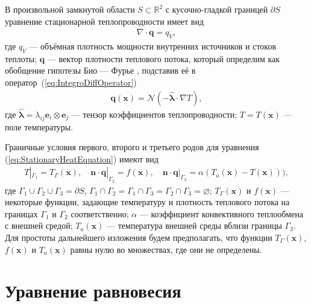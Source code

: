 В произвольной замкнутой области $S \subset \mathbb{R}^2$ с кусочно-гладкой границей $\partial S$ уравнение стационарной теплопроводности имеет вид \cite{MSS}
\begin{gather}
	\label{eq:StationaryHeatEquation}
	\nabla \cdot \boldsymbol{q} = q_V,
\end{gather}
где $q_V$ --- объёмная плотность мощности внутренних источников и стоков теплоты;
$\boldsymbol{q}$ --- вектор плотности теплового потока, который определим как обобщение гипотезы Био --- Фурье \cite{ThermoViscoElasticity1, ThermoViscoElasticity2, ThermoViscoElasticity3}, подставив её в \mbox{оператор~(\ref{eq:IntegroDiffOperator})}
\begin{gather}
	\label{eq:BiotFourier}
	\boldsymbol{q}(\boldsymbol{x}) = 
	\mathcal{N} \left( -\widehat{\boldsymbol{\lambda}} \cdot \nabla T \right),
\end{gather}
где $\widehat{\boldsymbol{\lambda}} = \lambda_{ij} \boldsymbol{e}_i \otimes \boldsymbol{e}_j$ --- тензор коэффициентов теплопроводности;
$T = T(\boldsymbol{x})$ --- поле температуры.

Граничные условия первого, второго и третьего родов для уравнения (\ref{eq:StationaryHeatEquation}) имеют вид \cite{MSS}
\begin{gather}
	\label{eq:ThermalBoundaries}
	T|_{\Gamma_1} = T_{\Gamma} (\boldsymbol{x}),
	\quad
	\boldsymbol{n} \cdot \boldsymbol{q}|_{\Gamma_2} = f(\boldsymbol{x}),
	\quad
	\boldsymbol{n} \cdot \boldsymbol{q}|_{\Gamma_3} = \alpha (T_a(\boldsymbol{x}) - T(\boldsymbol{x}))),
\end{gather}
где $\Gamma_1 \cup \Gamma_2 \cup \Gamma_3 = \partial S$, $\Gamma_1 \cap \Gamma_2 = \Gamma_1 \cap \Gamma_3 = \Gamma_2 \cap \Gamma_3 = \varnothing$;
$T_{\Gamma} (\boldsymbol{x})$ и $f(\boldsymbol{x})$ --- некоторые функции, задающие температуру и плотность теплового потока на границах $\Gamma_1$ и $\Gamma_2$ соответственно;
$\alpha$ --- коэффициент конвективного теплообмена с внешней средой;
$T_a (\boldsymbol{x})$ --- температура внешней среды вблизи границы $\Gamma_3$.
Для простоты дальнейшего изложения будем предполагать, что функции $T_{\Gamma}(\boldsymbol{x})$, $f(\boldsymbol{x})$ и $T_a(\boldsymbol{x})$ равны нулю во множествах, где они не определены.

\section{Уравнение равновесия}\label{sec:BasicRelations/EquilibriumEquation}

